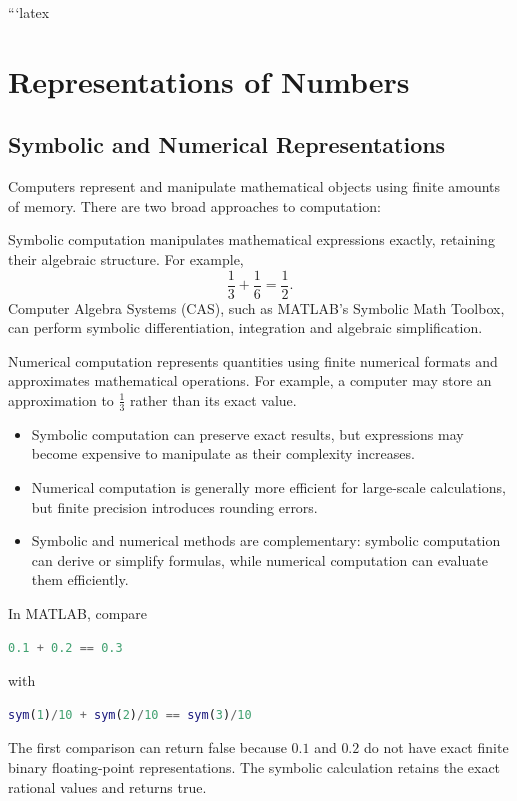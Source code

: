 ```latex
\section{Representations of Numbers}

\subsection{Symbolic and Numerical Representations}

Computers represent and manipulate mathematical objects using finite amounts of memory. There are two broad approaches to computation:

\begin{definition}
  Symbolic computation manipulates mathematical expressions exactly, retaining their algebraic structure. For example,
  \[
    \frac{1}{3}+\frac{1}{6}=\frac{1}{2}.
  \]
  Computer Algebra Systems (CAS), such as MATLAB's Symbolic Math Toolbox, can perform symbolic differentiation, integration and algebraic simplification.
\end{definition}

\begin{definition}
  Numerical computation represents quantities using finite numerical formats and approximates mathematical operations. For example, a computer may store an approximation to \(\frac{1}{3}\) rather than its exact value.
\end{definition}

\begin{remark}
  \begin{itemize} \emph{}
    \item Symbolic computation can preserve exact results, but expressions may become expensive to manipulate as their complexity increases.
    \item Numerical computation is generally more efficient for large-scale calculations, but finite precision introduces rounding errors.
    \item Symbolic and numerical methods are complementary: symbolic computation can derive or simplify formulas, while numerical computation can evaluate them efficiently.
  \end{itemize}
\end{remark}

\begin{example}
  In MATLAB, compare
  \begin{lstlisting}[language=Matlab]
  0.1 + 0.2 == 0.3
  \end{lstlisting}
  with
  \begin{lstlisting}[language=Matlab]
  sym(1)/10 + sym(2)/10 == sym(3)/10
  \end{lstlisting}
  The first comparison can return false because \(0.1\) and \(0.2\) do not have exact finite binary floating-point representations. The symbolic calculation retains the exact rational values and returns true.
\end{example}

